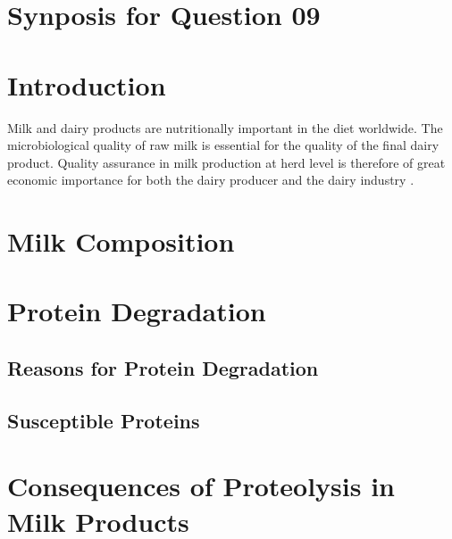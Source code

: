 \setcounter{chapter}{2}
\setcounter{section}{0}
\section*{Synposis for Question 09}

\section{Introduction}
Milk and dairy products are nutritionally important in the diet worldwide. The microbiological quality of raw milk is essential for the quality of the final dairy product. Quality assurance in milk production at herd level is therefore of great economic importance for both the dairy producer and the dairy industry \cite*{01_Åkerstedt}.


\section{Milk Composition}


\section{Protein Degradation}

\subsection{Reasons for Protein Degradation}


\subsection{Susceptible Proteins}


\section{Consequences of Proteolysis in Milk Products}




